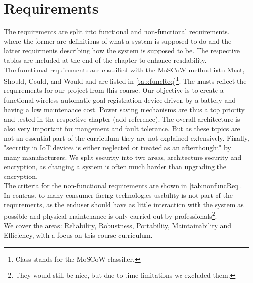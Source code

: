 \section{Requirements}
The requirements are split into functional and non-functional requirements, where the former are definitions of what a system is supposed to do and the latter requirments describing how the system is supposed to be. The respective tables are included at the end of the chapter to enhance readability.\\
The functional requirements are classified with the MoSCoW method into Must, Should, Could, and Would and are listed in \cref{tab:funcReq}\footnote{Class stands for the MoSCoW classifier.}. The musts reflect the requirements for our project from this course. Our objective is to create a functional wireless automatic goal registration device driven by a battery and having a low maintenance cost. Power saving mechanisms are thus a top priority and tested in the respective chapter (add reference). The overall architecture is also very important for mangement and fault tolerance. But as these topics are not an essential part of the curriculum they are not explained extensively. Finally, "security in IoT devices is either neglected or treated as an afterthought"\cite{wurm2016securityAftertought} by many manufacturers. We split security into two areas, architecture security and encryption, as changing a system is often much harder than upgrading the encryption.\\
The criteria for the non-functional requirements are shown in \cref{tab:nonfuncReq}.
In contrast to many consumer facing technologies usability is not part of the requirements, as the enduser should have as little interaction with the system as possible and physical maintenance is only carried out by professionals\footnote{They would still be nice, but due to time limitations we excluded them.}.\\ 
We cover the areas: Reliability, Robustness, Portability, Maintainability and Efficiency, with a focus on this course curriculum.

